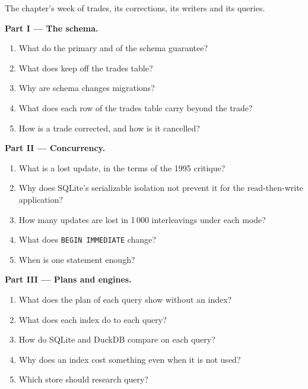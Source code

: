 \begin{problem}\label{pb:pl:databases-and-sql:1}
The chapter's week of trades, its corrections, its writers and its queries.

\medskip\noindent\textbf{Part I --- The schema.}
\begin{enumerate}
\item What do the primary and  of the schema guarantee?
\item What does  keep off the trades table?
\item Why are schema changes migrations?
\item What does each row of the trades table carry beyond the trade?
\item How is a trade corrected, and how is it cancelled?
\end{enumerate}

\medskip\noindent\textbf{Part II --- Concurrency.}
\begin{enumerate}[resume]
\item What is a lost update, in the terms of the 1995 critique?
\item Why does SQLite's serializable isolation not prevent it for the read-then-write application?
\item How many updates are lost in 1\,000 interleavings under each mode?
\item What does \texttt{BEGIN IMMEDIATE} change?
\item When is one statement enough?
\end{enumerate}

\medskip\noindent\textbf{Part III --- Plans and engines.}
\begin{enumerate}[resume]
\item What does the plan of each query show without an index?
\item What does each index do to each query?
\item How do SQLite and DuckDB compare on each query?
\item Why does an index cost something even when it is not used?
\item Which store should research query?
\end{enumerate}


\end{problem}
